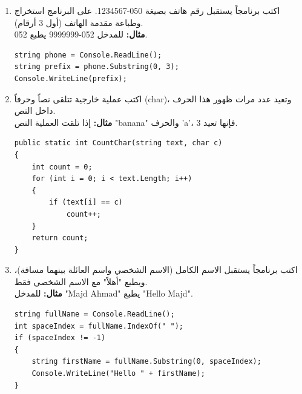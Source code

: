 \documentclass[14pt]{extarticle}
\begin{document}
\begin{enumerate}[itemsep=2em]
    \item
    اكتب برنامجاً يستقبل رقم هاتف بصيغة \textenglish{050-1234567}.
    على البرنامج استخراج وطباعة مقدمة الهاتف (أول 3 أرقام). \\
    \textbf{مثال:} للمدخل \textenglish{052-9999999} يطبع \textenglish{052}.
    \ifwithsols
    \begin{boxSolution}
    \begin{english}
    \begin{verbatim}
string phone = Console.ReadLine();
string prefix = phone.Substring(0, 3);
Console.WriteLine(prefix);
    \end{verbatim}
    \end{english}
    \end{boxSolution}
    \clearpage
    \fi

    \item
    اكتب عملية خارجية تتلقى نصاً وحرفاً (\textenglish{char})، وتعيد عدد مرات ظهور هذا الحرف داخل النص. \\
    \textbf{مثال:} إذا تلقت العملية النص \textenglish{"banana"} والحرف \textenglish{'a'}، فإنها تعيد 3.
    \ifwithsols
    \begin{boxSolution}
    \begin{english}
    \begin{verbatim}
public static int CountChar(string text, char c)
{
    int count = 0;
    for (int i = 0; i < text.Length; i++)
    {
        if (text[i] == c)
            count++;
    }
    return count;
}
    \end{verbatim}
    \end{english}
    \end{boxSolution}
    \fi

    \item
    اكتب برنامجاً يستقبل الاسم الكامل (الاسم الشخصي واسم العائلة بينهما مسافة)، ويطبع "أهلاً" مع الاسم الشخصي فقط. \\
    \textbf{مثال:} للمدخل \textenglish{"Majd Ahmad"} يطبع \textenglish{"Hello Majd"}.
    \ifwithsols
    \begin{boxSolution}
    \begin{english}
    \begin{verbatim}
string fullName = Console.ReadLine();
int spaceIndex = fullName.IndexOf(" ");
if (spaceIndex != -1)
{
    string firstName = fullName.Substring(0, spaceIndex);
    Console.WriteLine("Hello " + firstName);
}
    \end{verbatim}
    \end{english}
    \end{boxSolution}
    \fi
\end{enumerate}



\end{document}
